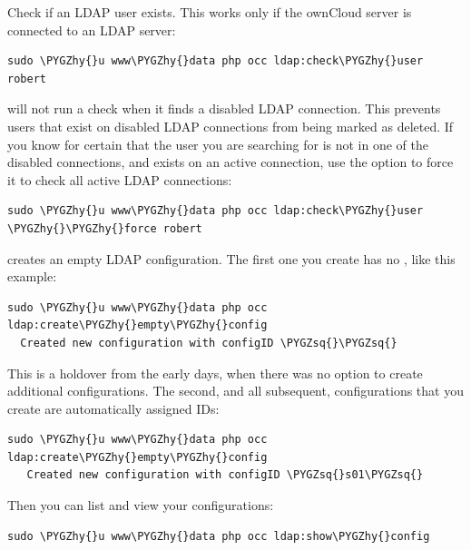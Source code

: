\documentclass[letterpaper,10pt,english]{sphinxmanual}
\def\PYGZhy{\char`\-}
\def\PYGZsq{\char`\'}
\renewcommand\PYGZsq{\textquotesingle}
\begin{document}
Check if an LDAP user exists. This works only if the ownCloud server is
connected to an LDAP server:

\begin{Verbatim}[commandchars=\\\{\}]
sudo \PYGZhy{}u www\PYGZhy{}data php occ ldap:check\PYGZhy{}user robert
\end{Verbatim}

 will not run a check when it finds a disabled LDAP
connection. This prevents users that exist on disabled LDAP connections from
being marked as deleted. If you know for certain that the user you are searching for
is not in one of the disabled connections, and exists on an active connection,
use the  option to force it to check all active LDAP connections:

\begin{Verbatim}[commandchars=\\\{\}]
sudo \PYGZhy{}u www\PYGZhy{}data php occ ldap:check\PYGZhy{}user \PYGZhy{}\PYGZhy{}force robert
\end{Verbatim}

 creates an empty LDAP configuration. The first
one you create has no , like this example:

\begin{Verbatim}[commandchars=\\\{\}]
sudo \PYGZhy{}u www\PYGZhy{}data php occ ldap:create\PYGZhy{}empty\PYGZhy{}config
  Created new configuration with configID \PYGZsq{}\PYGZsq{}
\end{Verbatim}

This is a holdover from the early days, when there was no option to create
additional configurations. The second, and all subsequent, configurations
that you create are automatically assigned IDs:

\begin{Verbatim}[commandchars=\\\{\}]
sudo \PYGZhy{}u www\PYGZhy{}data php occ ldap:create\PYGZhy{}empty\PYGZhy{}config
   Created new configuration with configID \PYGZsq{}s01\PYGZsq{}
\end{Verbatim}

Then you can list and view your configurations:

\begin{Verbatim}[commandchars=\\\{\}]
sudo \PYGZhy{}u www\PYGZhy{}data php occ ldap:show\PYGZhy{}config
\end{Verbatim}
\end{document}
